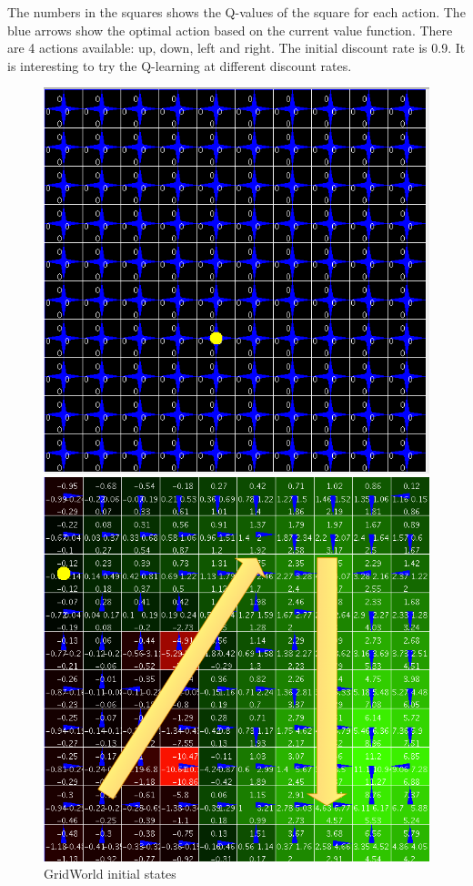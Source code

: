 The numbers in the squares shows the Q-values of the square for each action. The blue arrows show the optimal action based on the current value function. There are 4 actions available: up, down, left and right. The initial discount rate is 0.9. It is interesting to try the Q-learning at different discount rates.

\begin{figure}[h]
\begin{minipage}{.5\textwidth}
\centering
\includegraphics[width=1\textwidth]{./images/grid1.png}
\caption{GridWorld initial states}
\label{fig:gridworld1}
\end{minipage}
\begin{minipage}{.5\textwidth}
\centering
\includegraphics[width=1\textwidth]{./images/gridworld2.png}

\end{minipage}
\end{figure}
